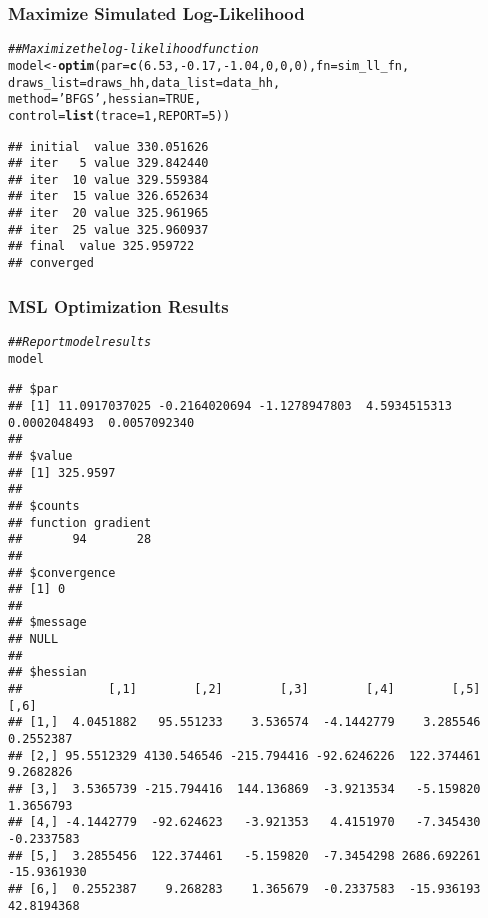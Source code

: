 \documentclass{beamer}\usepackage[]{graphicx}\usepackage[]{color}
\makeatletter
\newcommand{\hlnum}[1]{\textcolor[rgb]{0.686,0.059,0.569}{#1}}%
\newcommand{\hlstr}[1]{\textcolor[rgb]{0.192,0.494,0.8}{#1}}%
\newcommand{\hlcom}[1]{\textcolor[rgb]{0.678,0.584,0.686}{\textit{#1}}}%
\newcommand{\hlopt}[1]{\textcolor[rgb]{0,0,0}{#1}}%
\newcommand{\hlstd}[1]{\textcolor[rgb]{0.345,0.345,0.345}{#1}}%
\newcommand{\hlkwb}[1]{\textcolor[rgb]{0.69,0.353,0.396}{#1}}%
\newcommand{\hlkwc}[1]{\textcolor[rgb]{0.333,0.667,0.333}{#1}}%
\newcommand{\hlkwd}[1]{\textcolor[rgb]{0.737,0.353,0.396}{\textbf{#1}}}%
\newenvironment{kframe}{%
 \def\at@end@of@kframe{}%
 \ifinner\ifhmode%
  \def\at@end@of@kframe{\end{minipage}}%
  \begin{minipage}{\columnwidth}%
 \fi\fi%
 \def\FrameCommand##1{\hskip\@totalleftmargin \hskip-\fboxsep
 \colorbox{shadecolor}{##1}\hskip-\fboxsep
     \hskip-\linewidth \hskip-\@totalleftmargin \hskip\columnwidth}%
 \MakeFramed {\advance\hsize-\width
   \@totalleftmargin\z@ \linewidth\hsize
   \@setminipage}}%
 {\par\unskip\endMakeFramed%
 \at@end@of@kframe}
\newenvironment{knitrout}{}{} %
\makeatother
\begin{document}
\begin{frame}[fragile]\frametitle{Maximize Simulated Log-Likelihood}
\begin{knitrout}\footnotesize
{}\color{fgcolor}\begin{kframe}
\begin{alltt}
\hlcom{## Maximize the log-likelihood function}
\hlstd{model} \hlkwb{<-} \hlkwd{optim}\hlstd{(}\hlkwc{par} \hlstd{=} \hlkwd{c}\hlstd{(}\hlnum{6.53}\hlstd{,} \hlopt{-}\hlnum{0.17}\hlstd{,} \hlopt{-}\hlnum{1.04}\hlstd{,} \hlnum{0}\hlstd{,} \hlnum{0}\hlstd{,} \hlnum{0}\hlstd{),} \hlkwc{fn} \hlstd{= sim_ll_fn,}
               \hlkwc{draws_list} \hlstd{= draws_hh,} \hlkwc{data_list} \hlstd{= data_hh,}
               \hlkwc{method} \hlstd{=} \hlstr{'BFGS'}\hlstd{,} \hlkwc{hessian} \hlstd{=} \hlnum{TRUE}\hlstd{,}
               \hlkwc{control} \hlstd{=} \hlkwd{list}\hlstd{(}\hlkwc{trace} \hlstd{=} \hlnum{1}\hlstd{,} \hlkwc{REPORT} \hlstd{=} \hlnum{5}\hlstd{))}
\end{alltt}
\begin{verbatim}
## initial  value 330.051626 
## iter   5 value 329.842440
## iter  10 value 329.559384
## iter  15 value 326.652634
## iter  20 value 325.961965
## iter  25 value 325.960937
## final  value 325.959722 
## converged
\end{verbatim}
\end{kframe}
\end{knitrout}
\end{frame}

\begin{frame}[fragile]\frametitle{MSL Optimization Results}
    
\begin{knitrout}\tiny
{}\color{fgcolor}\begin{kframe}
\begin{alltt}
\hlcom{## Report model results}
\hlstd{model}
\end{alltt}
\begin{verbatim}
## $par
## [1] 11.0917037025 -0.2164020694 -1.1278947803  4.5934515313  0.0002048493  0.0057092340
## 
## $value
## [1] 325.9597
## 
## $counts
## function gradient 
##       94       28 
## 
## $convergence
## [1] 0
## 
## $message
## NULL
## 
## $hessian
##            [,1]        [,2]        [,3]        [,4]        [,5]        [,6]
## [1,]  4.0451882   95.551233    3.536574  -4.1442779    3.285546   0.2552387
## [2,] 95.5512329 4130.546546 -215.794416 -92.6246226  122.374461   9.2682826
## [3,]  3.5365739 -215.794416  144.136869  -3.9213534   -5.159820   1.3656793
## [4,] -4.1442779  -92.624623   -3.921353   4.4151970   -7.345430  -0.2337583
## [5,]  3.2855456  122.374461   -5.159820  -7.3454298 2686.692261 -15.9361930
## [6,]  0.2552387    9.268283    1.365679  -0.2337583  -15.936193  42.8194368
\end{verbatim}
\end{kframe}
\end{knitrout}
\end{frame}
\end{document}
